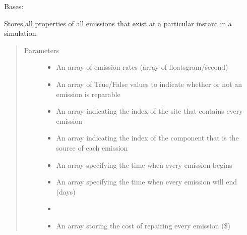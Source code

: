 \documentclass[letterpaper,10pt,english]{sphinxmanual}
\begin{document}
\begin{fulllineitems}
\label{\detokenize{index:feast.EmissionSimModules.emission_class_functions.Emission}}
Bases: 

Stores all properties of all emissions that exist at a particular instant in a simulation.
\begin{quote}\begin{description}
\item[{Parameters}] \leavevmode\begin{itemize}
\item {} 
 \textendash{} An array of emission rates (array of floats\textendash{}gram/second)

\item {} 
 \textendash{} An array of True/False values to indicate whether or not an emission is reparable

\item {} 
 \textendash{} An array indicating the index of the site that contains every emission

\item {} 
 \textendash{} An array indicating the index of the component that is the source of each emission

\item {} 
 \textendash{} An array specifying the time when every emission begins

\item {} 
 \textendash{} An array specifying the time when every emission will end (days)

\item {} 
 \textendash{} 

\item {} 
 \textendash{} An array storing the cost of repairing every emission (\$)


\end{itemize}
\end{description}
\end{quote}
\end{fulllineitems}
\end{document}
